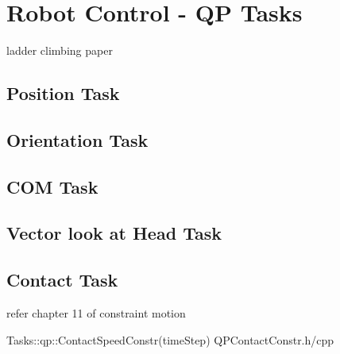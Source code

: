 \clearpage
\section{Robot Control - QP Tasks}\label{qpTasks}
ladder climbing paper~\cite{ladder-HRP-2Kai}

\subsection{Position Task}\label{positionTask}

\subsection{Orientation Task}\label{orientationTask}

\subsection{COM Task}\label{comTask}

\subsection{Vector look at Head Task}\label{HeadTask}

\subsection{Contact Task}\label{contact}
refer chapter 11 of \cite{featherstone2014rigid}
constraint motion

Tasks::qp::ContactSpeedConstr(timeStep)
QPContactConstr.h/cpp

